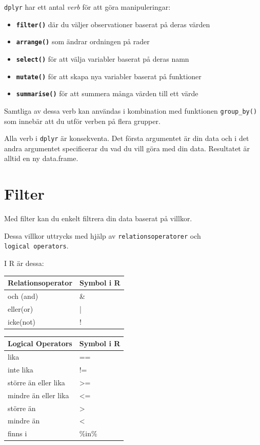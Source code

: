 \documentclass[
]{book}
\providecommand{\tightlist}{%
  \setlength{\itemsep}{0pt}\setlength{\parskip}{0pt}}
\begin{document}
\texttt{dplyr} har ett antal \emph{verb} för att göra manipuleringar:

\begin{itemize}
\tightlist
\item
  \textbf{\texttt{filter()}} där du väljer observationer baserat på deras värden
\item
  \textbf{\texttt{arrange()}} som ändrar ordningen på rader
\item
  \textbf{\texttt{select()}} för att välja variabler baserat på deras namn
\item
  \textbf{\texttt{mutate()}} för att skapa nya variabler baserat på funktioner
\item
  \textbf{\texttt{summarise()}} för att summera många värden till ett värde
\end{itemize}

Samtliga av dessa verb kan användas i kombination med funktionen \texttt{group\_by()} som innebär att du utför verben på flera grupper.

Alla verb i \texttt{dplyr} är konsekventa. Det första argumentet är din data och i det andra argumentet specificerar du vad du vill göra med din data. Resultatet är alltid en ny data.frame.

\hypertarget{filter}{%
\section{Filter}\label{filter}}

Med filter kan du enkelt filtrera din data baserat på villkor.

Dessa villkor uttrycks med hjälp av \texttt{relationsoperatorer} och \texttt{logical\ operators}.

I R är dessa:

\begin{tabular}{l|l}
\hline
Relationsoperator & Symbol i R\\
\hline
och (and) & \&\\
\hline
eller(or) & |\\
\hline
icke(not) & !\\
\hline
\end{tabular}

\begin{tabular}{l|l}
\hline
Logical Operators & Symbol i R\\
\hline
lika & ==\\
\hline
inte lika & !=\\
\hline
större än eller lika & >=\\
\hline
mindre än eller lika & <=\\
\hline
större än & >\\
\hline
mindre än & <\\
\hline
finns i & \%in\%\\
\hline
\end{tabular}
\end{document}
